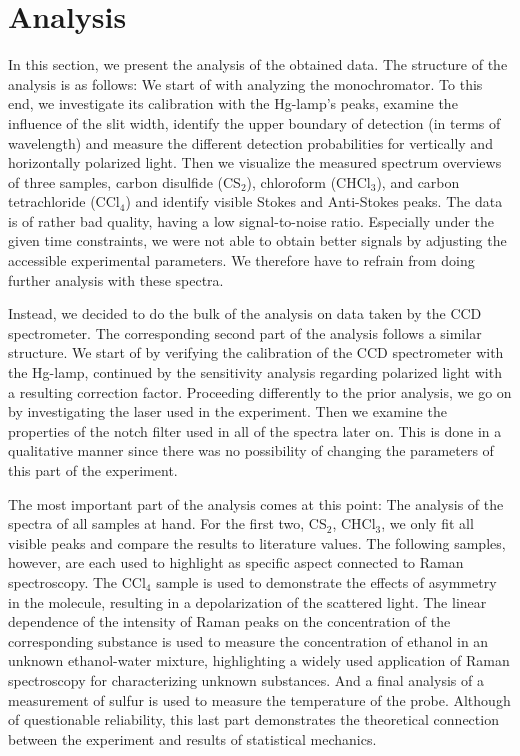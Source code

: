\renewcommand{\arraystretch}{1.2}
\section{Analysis}
In this section, we present the analysis of the obtained data. The structure of the analysis is as follows: We start 
of with analyzing the monochromator. To this end, we investigate its calibration with the Hg-lamp's peaks, examine 
the influence of the slit width, identify the upper boundary of detection (in terms of wavelength) and measure the 
different detection probabilities for vertically and horizontally polarized light. 
Then we visualize the measured spectrum overviews of three samples, carbon disulfide (CS$_2$), chloroform (CHCl$_3$),
and carbon tetrachloride (CCl$_4$) and identify visible Stokes 
and Anti-Stokes peaks. The data is of rather bad quality, having a low signal-to-noise ratio. Especially under the given 
time constraints, we were not able to obtain better signals by adjusting the accessible experimental parameters. We 
therefore have to refrain from doing further analysis with these spectra. 

Instead, we decided to do the bulk of the analysis on data taken by the CCD spectrometer. The corresponding second part 
of the analysis follows a similar structure. We start of by verifying the calibration of the CCD spectrometer with the 
Hg-lamp, continued by the sensitivity analysis regarding polarized light with a resulting correction factor. Proceeding 
differently to the prior analysis, we go on by investigating the laser used in the experiment. Then we examine the 
properties of the notch filter used in all of the spectra later on. This is done in a qualitative manner since there was 
no possibility of changing the parameters of this part of the experiment. 

The most important part of the analysis comes at this point: The analysis of the spectra of all samples at hand. For 
the first two, CS$_2$, CHCl$_3$, we only fit all visible peaks and compare the results to literature values. The following 
samples, however, are each used to highlight as specific aspect connected to Raman spectroscopy. The CCl$_4$ sample is 
used to demonstrate the effects of asymmetry in the molecule, resulting in a depolarization of the scattered light. The 
linear dependence of the intensity of Raman peaks on the concentration of the corresponding substance is used to measure 
the concentration of ethanol in an unknown ethanol-water mixture, highlighting a widely used application of Raman 
spectroscopy for characterizing unknown substances. And a final analysis of a measurement of sulfur is used to measure the 
temperature of the probe. Although of questionable reliability, this last part demonstrates the theoretical connection 
between the experiment and results of statistical mechanics. 

